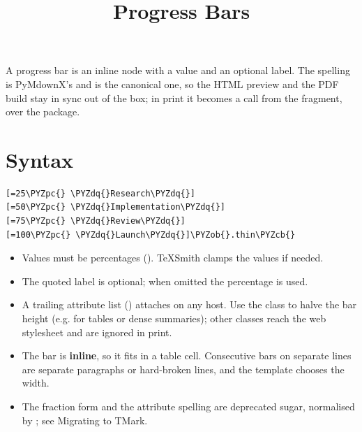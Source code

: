 \documentclass[a4paper,twoside]{article}
\title{Progress Bars}
\author{}\date{}
\begin{document}
\maketitle
A progress bar is an inline node with a value and an optional label. The
spelling is PyMdownX's and is the canonical one, so the HTML preview and the
PDF build stay in sync out of the box; in print it becomes a 
call from the  fragment, over the
\href{https://ctan.org/pkg/progressbar}{} package.
\section{Syntax}
\begin{tscode}[lang=markdown, engine=pygments]
\begin{Verbatim}[commandchars=\\\{\},breaklines, breakanywhere, commandchars=\\\{\}]
[=25\PYZpc{} \PYZdq{}Research\PYZdq{}]
[=50\PYZpc{} \PYZdq{}Implementation\PYZdq{}]
[=75\PYZpc{} \PYZdq{}Review\PYZdq{}]
[=100\PYZpc{} \PYZdq{}Launch\PYZdq{}]\PYZob{}.thin\PYZcb{}
\end{Verbatim}
\end{tscode}
\begin{itemize}
\item Values must be percentages (). TeXSmith clamps the values if needed.
\item The quoted label is optional; when omitted the percentage is used.
\item A trailing attribute list () attaches on any host. Use the
 class to halve the bar height (e.g. for tables or dense summaries);
other classes reach the web stylesheet and are ignored in print.
\item The bar is \textbf{inline}, so it fits in a table cell. Consecutive bars on
separate lines are separate paragraphs or hard-broken lines, and the template
chooses the width.
\item The fraction form \tscodeinline{[=9/20 "Review"]} and the  attribute spelling
are deprecated sugar, normalised by ; see
Migrating to TMark.
\end{itemize}
\end{document}

